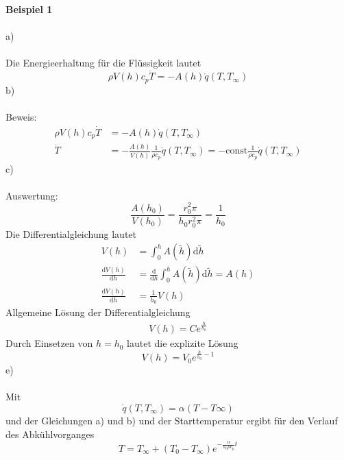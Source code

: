 \textbf{Beispiel 1}\\ \\
a)\\ \\
Die Energieerhaltung für die Flüssigkeit lautet
\[
	\rho V(h)c_p\dot{T} = -A(h)\dot{q}(T,T_\infty)
\]
b)\\ \\
Beweis:
\begin{align*}
	\rho V(h)c_p\dot{T} &= -A(h)\dot{q}(T,T_\infty) \\
	\dot{T} &= -\frac{A(h)}{V(h)}\frac{1}{\rho c_p}\dot{q}(T,T_\infty) = -\text{const}\frac{1}{\rho c_p}\dot{q}(T,T_\infty)
\end{align*}
c)\\ \\
Auswertung:
\[
	\frac{A(h_0)}{V(h_0)} = \frac{r_0^2\pi}{h_0r^2_0\pi} = \frac{1}{h_0}
\]
Die Differentialgleichung lautet
\begin{align*}
	V(h) &= \int_{0}^{h}A(\tilde{h})\text{d}\tilde{h} \\
	\frac{\text{d}V(h)}{\text{d}h} &= \frac{\text{d}}{\text{d}h}\int_{0}^{h}A(\tilde{h})\text{d}\tilde{h} = A(h) \\
	\frac{\text{d}V(h)}{\text{d}h} &= \frac{1}{h_0}V(h)
\end{align*}
Allgemeine Lösung der Differentialgleichung
\begin{align*}
	V(h) = Ce^{\frac{h}{h_0}}
\end{align*}
Durch Einsetzen von $h = h_0$ lautet die explizite Lösung
\[
	V(h) = V_0e^{\frac{h}{h_0} - 1}
\]
e)\\ \\
Mit
\[
	\dot{q}(T,T_\infty) = \alpha(T - T\infty)
\]
und der Gleichungen a) und b) und der Starttemperatur ergibt für den Verlauf des Abkühlvorganges
\[
	T = T_\infty + (T_0 - T_\infty)e^{-\frac{\alpha}{h_0\rho c_p}t}
\]